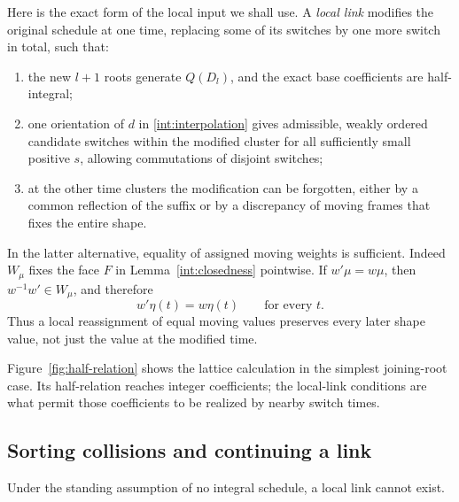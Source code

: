 Here is the exact form of the local input we shall use.  A
\emph{local link} modifies the original schedule at one time, replacing
some of its switches by one more switch in total, such that:
\begin{enumerate}[label=\textup{(\alph*)}]
\item the new \(l+1\) roots generate \(Q(D_l)\), and the exact base
coefficients are half-integral;
\item one orientation of \(d\) in \eqref{int:interpolation} gives
admissible, weakly ordered candidate switches within the modified
cluster for all sufficiently small positive \(s\), allowing
commutations of disjoint switches;
\item at the other time clusters the modification can be forgotten,
either by a common reflection of the suffix or by a discrepancy of
moving frames that fixes the entire shape.
\end{enumerate}
In the latter alternative, equality of assigned moving weights is
sufficient.  Indeed \(W_\mu\) fixes the face \(F\) in
Lemma~\ref{int:closedness} pointwise.  If
\(w'\mu=w\mu\), then \(w^{-1}w'\in W_\mu\), and therefore
\begin{equation}\label{int:whole-shape}
 w'\eta(t)=w\eta(t)\qquad\text{for every }t.
\end{equation}
Thus a local reassignment of equal moving values preserves every later
shape value, not just the value at the modified time.

Figure~\ref{fig:half-relation} shows the lattice calculation in the
simplest joining-root case.  Its half-relation reaches integer
coefficients; the local-link conditions are what permit those
coefficients to be realized by nearby switch times.


\subsection{Sorting collisions and continuing a link}

\begin{proposition}[Continuation]\label{prop:continuation}
Under the standing assumption of no integral schedule, a local link
cannot exist.
\end{proposition}

